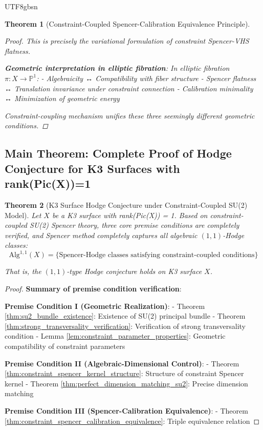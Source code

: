 \documentclass[a4paper,12pt]{extarticle}
\newtheorem{theorem}{Theorem}[section]
\theoremstyle{definition}
\begin{document}
\begin{CJK}{UTF8}{gbsn}
\begin{theorem}[Constraint-Coupled Spencer-Calibration Equivalence Principle]
\begin{proof}
This is precisely the variational formulation of constraint Spencer-VHS flatness.

\textbf{Geometric interpretation in elliptic fibration}:
In elliptic fibration $\pi: X \to \mathbb{P}^1$:
- Algebraicity ↔ Compatibility with fiber structure
- Spencer flatness ↔ Translation invariance under constraint connection  
- Calibration minimality ↔ Minimization of geometric energy

Constraint-coupling mechanism unifies these three seemingly different geometric conditions.
\end{proof}
\end{theorem}

\subsection{Main Theorem: Complete Proof of Hodge Conjecture for K3 Surfaces with rank(Pic(X))=1}
\label{subsec:main_theorem_k3_hodge}

\begin{theorem}[K3 Surface Hodge Conjecture under Constraint-Coupled SU(2) Model]
\label{thm:main_k3_hodge_constraint_coupled}
Let $X$ be a K3 surface with rank(Pic(X)) = 1. Based on constraint-coupled SU(2) Spencer theory, three core premise conditions are completely verified, and Spencer method completely captures all algebraic $(1,1)$-Hodge classes:
$$\text{Alg}^{1,1}(X) = \{\text{Spencer-Hodge classes satisfying constraint-coupled conditions}\}$$

That is, the $(1,1)$-type Hodge conjecture holds on K3 surface $X$.
\end{theorem}

\begin{proof}
\textbf{Summary of premise condition verification}:

\textbf{Premise Condition I (Geometric Realization)}:
- Theorem \ref{thm:su2_bundle_existence}: Existence of SU(2) principal bundle
- Theorem \ref{thm:strong_transversality_verification}: Verification of strong transversality condition
- Lemma \ref{lem:constraint_parameter_properties}: Geometric compatibility of constraint parameters

\textbf{Premise Condition II (Algebraic-Dimensional Control)}:
- Theorem \ref{thm:constraint_spencer_kernel_structure}: Structure of constraint Spencer kernel
- Theorem \ref{thm:perfect_dimension_matching_su2}: Precise dimension matching

\textbf{Premise Condition III (Spencer-Calibration Equivalence)}:
- Theorem \ref{thm:constraint_spencer_calibration_equivalence}: Triple equivalence relation


\end{proof}
\end{CJK}
\end{document}
